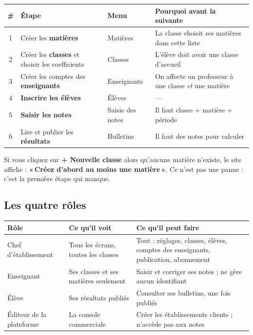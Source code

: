 \documentclass[11pt,a4paper]{article}
\newcommand{\menu}[1]{\textbf{«\,#1\,»}}
\newcommand{\bouton}[1]{\textbf{#1}}
\begin{document}
\begin{center}
\renewcommand{\arraystretch}{1.25}
\begin{tabularx}{\textwidth}{@{}c >{\raggedright}p{3.9cm} >{\raggedright}p{2.9cm} X@{}}
\toprule
\textbf{\#} & \textbf{Étape} & \textbf{Menu} & \textbf{Pourquoi avant la suivante} \\
\midrule
1 & Créer les \textbf{matières} & Matières & La classe choisit ses matières dans cette liste \\
2 & Créer les \textbf{classes} et choisir les coefficients & Classes & L'élève doit avoir une classe d'accueil \\
3 & Créer les comptes des \textbf{enseignants} & Enseignants & On affecte un professeur à une classe \emph{et} une matière \\
4 & \textbf{Inscrire les élèves} & Élèves & — \\
5 & \textbf{Saisir les notes} & Saisie des notes & Il faut classe + matière + période \\
6 & Lire et publier les \textbf{résultats} & Bulletins & Il faut des notes pour calculer \\
\bottomrule
\end{tabularx}
\end{center}

\begin{boiteattention}
Si vous cliquez sur \bouton{+ Nouvelle classe} alors qu'aucune matière n'existe,
le site affiche : \menu{Créez d'abord au moins une matière}. Ce n'est pas une
panne : c'est la première étape qui manque.
\end{boiteattention}

\subsection{Les quatre rôles}

\begin{center}
\renewcommand{\arraystretch}{1.25}
\begin{tabularx}{\textwidth}{@{} >{\raggedright}p{3.4cm} >{\raggedright}p{4.2cm} X@{}}
\toprule
\textbf{Rôle} & \textbf{Ce qu'il voit} & \textbf{Ce qu'il peut faire} \\
\midrule
Chef d'établissement & Tous les écrans, toutes les classes & Tout : réglages, classes, élèves,
comptes des enseignants, publication, abonnement \\
Enseignant & Ses classes et ses matières seulement & Saisir et corriger ses notes ;
ne gère aucun identifiant \\
Élève & Ses résultats publiés & Consulter ses bulletins, une fois publiés \\
Éditeur de la plateforme & La console commerciale & Créer les établissements clients ;
n'accède pas aux notes \\
\bottomrule
\end{tabularx}
\end{center}
\end{document}
